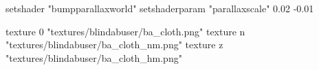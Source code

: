 	setshader "bumpparallaxworld"
	setshaderparam "parallaxscale" 0.02 -0.01

		texture 0 "textures/blindabuser/ba_cloth.png"
		texture n "textures/blindabuser/ba_cloth_nm.png"
		texture z "textures/blindabuser/ba_cloth_hm.png"
